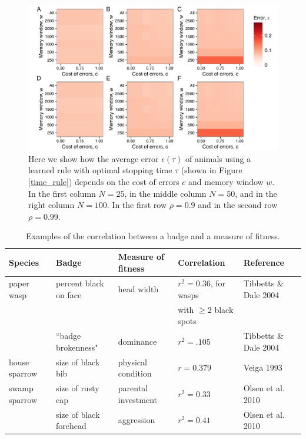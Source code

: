 \begin{figure}
\includegraphics[width=6.85in]{figures/error_heat_maps_rule.pdf}
\caption{\sffamily\small\textbf{} Here we show how the average error $\epsilon(\tau)$ of animals using a learned rule with optimal stopping time $\tau$ (shown in Figure \ref{time_rule}) depends on the cost of errors $c$ and memory window $w$. In the first column $N=25$, in the middle column $N=50$, and in the right column $N=100$. In the first  row $\rho=0.9$ and in the second row $\rho=0.99$.}
\label{error_rule}
\end{figure}

\begin{table}
\caption{\label{corr_examples} Examples of the correlation between a badge and a measure of fitness.}
\begin{tabular}{lllll}
Species & Badge & Measure of fitness & Correlation & Reference
\\\hline paper wasp & percent black on face & head width & $r^2=0.36$, for wasps  & Tibbetts \& Dale 2004
\\ & & & with $\geq 2$ black spots
\\ & ``badge brokenness" & dominance & $r^2=.105$ & Tibbetts \& Dale 2004
\\ \hline house sparrow & size of black bib & physical condition & $r=0.379$ & Veiga 1993
\\ \hline swamp sparrow & size of rusty cap & parental investment & $r^2=0.33$ & Olsen et al. 2010
\\ & size of black forehead & aggression & $r^2=0.41$ & Olsen et al. 2010
\end{tabular}
\end{table}


